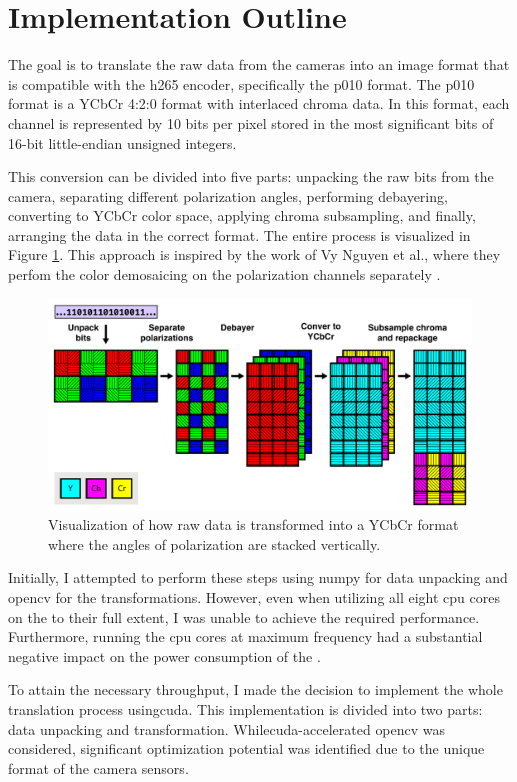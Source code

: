 \section{Implementation Outline}
The goal is to translate the raw data from the cameras into an image format that is compatible with the \gls{h265} encoder, specifically the \gls{p010} format.
The \gls{p010} format is a YCbCr 4:2:0 format with interlaced chroma data.
In this format, each channel is represented by 10 bits per pixel stored in the most significant bits of 16-bit little-endian unsigned integers.

This conversion can be divided into five parts: unpacking the raw bits from the camera, separating different polarization angles, performing debayering, converting to YCbCr color space, applying chroma subsampling, and finally, arranging the data in the correct format.
The entire process is visualized in Figure \ref{fig:transform}.
This approach is inspired by the work of Vy Nguyen et al., where they perfom the color demosaicing on the polarization channels separately \cite{nguyenTwoStepColorPolarizationDemosaicking2022}.


\begin{figure}[H]
    \centering
    \includegraphics[width=\textwidth]{figures/polarized_image/transform.pdf}
    \caption{Visualization of how raw data is transformed into a YCbCr format where the angles of polarization are stacked vertically.}
    \label{fig:transform}
\end{figure}


Initially, I attempted to perform these steps using \gls{numpy} for data unpacking and \gls{opencv} for the transformations.
However, even when utilizing all eight \gls{cpu} cores on the \jx to their full extent, I was unable to achieve the required performance.
Furthermore, running the \gls{cpu} cores at maximum frequency had a substantial negative impact on the power consumption of the \jx.

To attain the necessary throughput, I made the decision to implement the whole translation process using\gls{cuda}.
This implementation is divided into two parts: data unpacking and transformation.
While\gls{cuda}-accelerated \gls{opencv} was considered, significant optimization potential was identified due to the unique format of the camera sensors.
